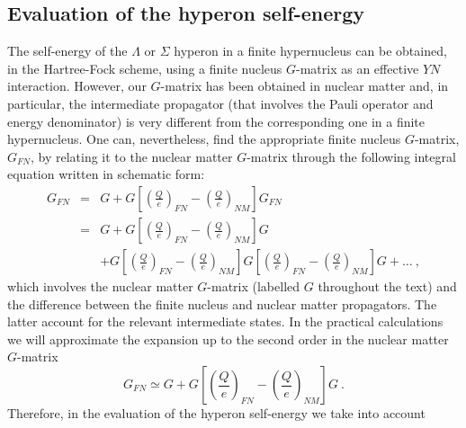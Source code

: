 
\subsection{Evaluation of the hyperon self-energy}

The self-energy of the $\Lambda$ or $\Sigma$ hyperon in a finite
hypernucleus can be obtained, in the Hartree-Fock scheme, using a
finite nucleus $G$-matrix as an effective $YN$ interaction. 
However, our $G$-matrix
has been obtained in nuclear matter and, in particular, the
intermediate propagator (that involves the Pauli operator and energy
denominator) is very different from the corresponding one in a finite
hypernucleus.  One can, nevertheless, find the appropriate finite 
nucleus $G$-matrix, $G_{FN}$, by relating it to the 
nuclear matter $G$-matrix through the following integral equation written 
in schematic form:
\begin{eqnarray}
G_{FN} &= &G + G \left[ \left( \frac{Q}{e} \right)_{FN} 
-\left( \frac{Q}{e} \right)_{NM} \right] G_{FN} \nonumber \\
&= &G + G \left[ \left( \frac{Q}{e} \right)_{FN} 
-\left( \frac{Q}{e} \right)_{NM} \right] G  \nonumber \\
&& + G \left[ \left( \frac{Q}{e} \right)_{FN}  
-\left( \frac{Q}{e} \right)_{NM} \right] 
 G \left[ \left( \frac{Q}{e} \right)_{FN} 
-\left( \frac{Q}{e} \right)_{NM} \right] G + \dots  \ ,
\label{eq:gexpan}
\end{eqnarray}
which involves the nuclear matter $G$-matrix (labelled $G$ throughout the
text) and the difference between
the finite nucleus and nuclear matter propagators. The latter account
for the relevant intermediate states.
In the practical calculations we will approximate
the expansion up to the second order in the nuclear matter $G$-matrix
\begin{equation}
G_{FN} \simeq G + G \left[ \left( \frac{Q}{e} \right)_{FN} 
-\left( \frac{Q}{e} \right)_{NM} \right] G \ . 
\label{eq:gexpan2}
\end{equation}
Therefore, in the evaluation of the hyperon
self-energy we take into account 
